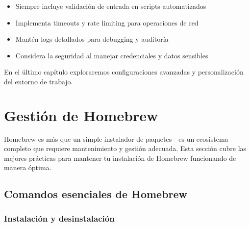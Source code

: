 \documentclass[
  11pt,
  letterpaper,
  oneside,
  openany]{scrbook}
\providecommand{\tightlist}{%
  \setlength{\itemsep}{0pt}\setlength{\parskip}{0pt}}
\begin{document}
\begin{tcolorbox}[enhanced jigsaw, coltitle=black, breakable, arc=.35mm, toprule=.15mm, colbacktitle=quarto-callout-important-color!10!white, colframe=quarto-callout-important-color-frame, opacityback=0, colback=white, bottomtitle=1mm, bottomrule=.15mm, rightrule=.15mm, left=2mm, toptitle=1mm, leftrule=.75mm, title=\textcolor{quarto-callout-important-color}{\faExclamation}\hspace{0.5em}{Consideraciones para automatización}, titlerule=0mm, opacitybacktitle=0.6]

\begin{itemize}
\tightlist
\item
  Siempre incluye validación de entrada en scripts automatizados
\item
  Implementa timeouts y rate limiting para operaciones de red
\item
  Mantén logs detallados para debugging y auditoría
\item
  Considera la seguridad al manejar credenciales y datos sensibles
\end{itemize}

\end{tcolorbox}

En el último capítulo exploraremos configuraciones avanzadas y
personalización del entorno de trabajo.

\chapter{Gestión de Homebrew}\label{gestiuxf3n-de-homebrew}

Homebrew es más que un simple instalador de paquetes - es un ecosistema
completo que requiere mantenimiento y gestión adecuada. Esta sección
cubre las mejores prácticas para mantener tu instalación de Homebrew
funcionando de manera óptima.

\section{Comandos esenciales de
Homebrew}\label{comandos-esenciales-de-homebrew}

\subsection{Instalación y
desinstalación}\label{instalaciuxf3n-y-desinstalaciuxf3n}
\end{document}
